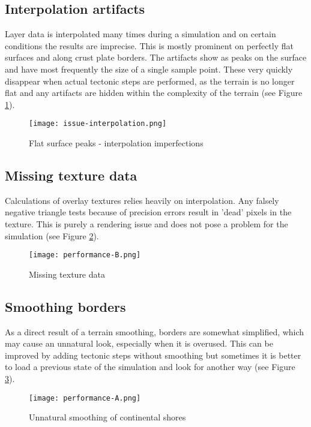 \subsection{Interpolation artifacts}
Layer data is interpolated many times during a simulation and on certain conditions the results are imprecise. This is mostly prominent on perfectly flat surfaces and along crust plate borders. The artifacts show as peaks on the surface and have most frequently the size of a single sample point. These very quickly disappear when actual tectonic steps are performed, as the terrain is no longer flat and any artifacts are hidden within the complexity of the terrain (see Figure \ref{fig:issue-interpolation}).
\begin{figure}[ht!]
\centering
\texttt{[image: issue-interpolation.png]}
\caption{Flat surface peaks - interpolation imperfections}
\label{fig:issue-interpolation}
\end{figure}

\subsection{Missing texture data}
Calculations of overlay textures relies heavily on interpolation. Any falsely negative triangle tests because of precision errors result in 'dead' pixels in the texture. This is purely a rendering issue and does not pose a problem for the simulation (see Figure \ref{fig:issue-dead-pixels}).
\begin{figure}[ht!]
\centering
\texttt{[image: performance-B.png]}
\caption{Missing texture data}
\label{fig:issue-dead-pixels}
\end{figure}

\subsection{Smoothing borders}
As a direct result of a terrain smoothing, borders are somewhat simplified, which may cause an unnatural look, especially when it is overused. This can be improved by adding tectonic steps without smoothing but sometimes it is better to load a previous state of the simulation and look for another way (see Figure \ref{fig:issue-blobs}).
\begin{figure}[ht!]
\centering
\texttt{[image: performance-A.png]}
\caption{Unnatural smoothing of continental shores}
\label{fig:issue-blobs}
\end{figure}

